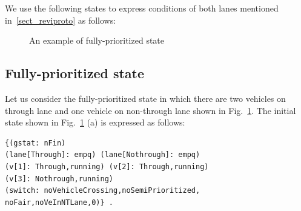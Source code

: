 \documentclass[10pt, conference, compsocconf]{IEEEtran}
\begin{document}
We use the following states to express conditions of both lanes mentioned in~\ref{sect_reviproto} as follows:


\begin{figure}[tb]
\begin{center}
\end{center}
\caption{An example of fully-prioritized state}
\label{fully_fig}
\end{figure}

\subsection{Fully-prioritized state}

Let us consider the fully-prioritized state in which there are two vehicles on through lane and one vehicle on non-through lane shown in Fig.~\ref{fully_fig}. 
The initial state shown in Fig.~\ref{fully_fig} (a) is expressed as follows:
 
\begin{footnotesize}
\begin{verbatim}
{(gstat: nFin) 
(lane[Through]: empq) (lane[Nothrough]: empq) 
(v[1]: Through,running) (v[2]: Through,running)
(v[3]: Nothrough,running)
(switch: noVehicleCrossing,noSemiPrioritized,
noFair,noVeInNTLane,0)} .
\end{verbatim}
\end{footnotesize}

\end{document}
